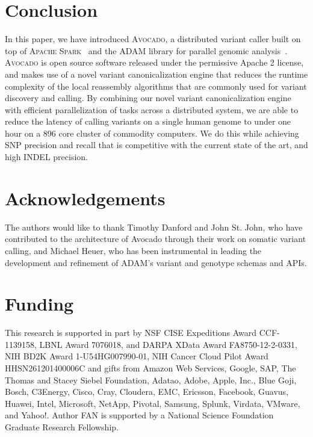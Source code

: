 \documentclass{bioinfo}
\begin{document}
\section{Conclusion}
\label{sec:conclusion}

In this paper, we have introduced \textsc{Avocado}, a distributed variant caller
built on top of \textsc{Apache Spark}~\citep{zaharia10, zaharia12} and the
\textsc{ADAM} library for parallel genomic analysis~\citep{massie13, nothaft15}.
\textsc{Avocado} is open source software released under the permissive Apache 2
license, and makes use of a novel variant canonicalization engine that
reduces the runtime complexity of the local reassembly algorithms that are
commonly used for variant discovery and calling. By combining our novel variant
canonicalization engine with efficient parallelization of tasks across a
distributed system, we are able to reduce the latency of calling variants on a
single human genome to under one hour on a 896 core cluster of commodity
computers. We do this while achieving SNP precision and recall that is
competitive with the current state of the art, and high INDEL precision.

\section*{Acknowledgements}

The authors would like to thank Timothy Danford and John St. John, who have
contributed to the architecture of Avocado through their work on somatic
variant calling, and Michael Heuer, who has been instrumental in leading
the development and refinement of \textsc{ADAM}'s variant and genotype
schemas and APIs.

\section*{Funding}

This research is supported in part by NSF CISE Expeditions Award CCF-1139158,
LBNL Award 7076018, and DARPA XData Award FA8750-12-2-0331, NIH BD2K Award
1-U54HG007990-01, NIH Cancer Cloud Pilot Award HHSN261201400006C and gifts
from Amazon Web Services, Google, SAP,  The Thomas and Stacey Siebel
Foundation, Adatao, Adobe, Apple, Inc., Blue Goji, Bosch, C3Energy, Cisco,
Cray, Cloudera, EMC, Ericsson, Facebook, Guavus, Huawei, Intel, Microsoft,
NetApp, Pivotal, Samsung, Splunk, Virdata, VMware, and Yahoo!. Author FAN is
supported by a National Science Foundation Graduate Research Fellowship.

\vspace*{-12pt}


%
%
%
%
%
%
%

\end{document}
